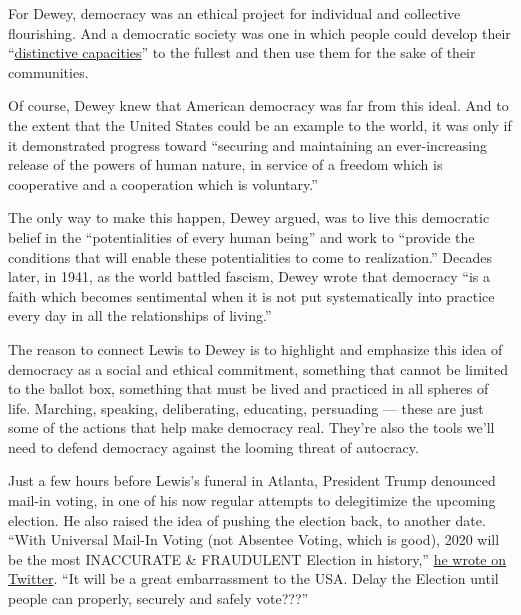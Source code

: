For Dewey, democracy was an ethical project for individual and
collective flourishing. And a democratic society was one in which people
could develop their
``\href{https://www.gutenberg.org/files/852/852-h/852-h.htm}{distinctive
capacities}'' to the fullest and then use them for the sake of their
communities.

Of course, Dewey knew that American democracy was far from this ideal.
And to the extent that the United States could be an example to the
world, it was only if it demonstrated progress toward ``securing and
maintaining an ever-increasing release of the powers of human nature, in
service of a freedom which is cooperative and a cooperation which is
voluntary.''

The only way to make this happen, Dewey argued, was to live this
democratic belief in the ``potentialities of every human being'' and
work to ``provide the conditions that will enable these potentialities
to come to realization.'' Decades later, in 1941, as the world battled
fascism, Dewey wrote that democracy ``is a faith which becomes
sentimental when it is not put systematically into practice every day in
all the relationships of living.''

The reason to connect Lewis to Dewey is to highlight and emphasize this
idea of democracy as a social and ethical commitment, something that
cannot be limited to the ballot box, something that must be lived and
practiced in all spheres of life. Marching, speaking, deliberating,
educating, persuading --- these are just some of the actions that help
make democracy real. They're also the tools we'll need to defend
democracy against the looming threat of autocracy.

Just a few hours before Lewis's funeral in Atlanta, President Trump
denounced mail-in voting, in one of his now regular attempts to
delegitimize the upcoming election. He also raised the idea of pushing
the election back, to another date. ``With Universal Mail-In Voting (not
Absentee Voting, which is good), 2020 will be the most INACCURATE \&
FRAUDULENT Election in history,''
\href{https://twitter.com/realdonaldtrump/status/1288818160389558273?s=21}{he
wrote on Twitter}. ``It will be a great embarrassment to the USA. Delay
the Election until people can properly, securely and safely vote???''

